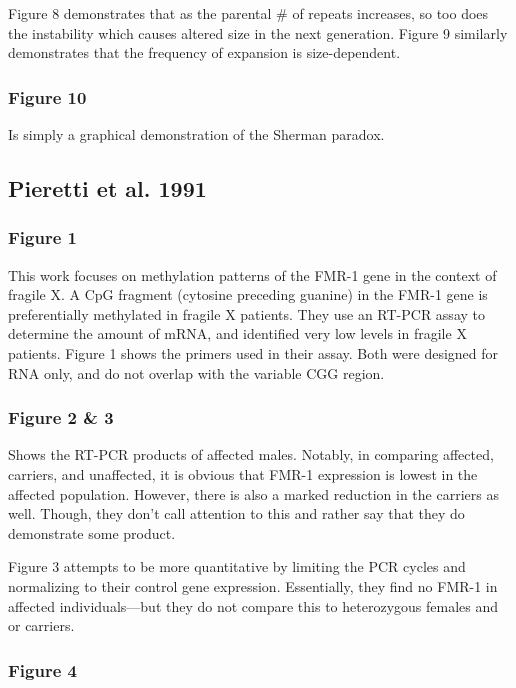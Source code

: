 \documentclass[12pt]{report}
\begin{document}
Figure 8 demonstrates that as the parental \# of repeats increases, so too does the instability which causes altered size in the next generation. Figure 9 similarly demonstrates that the frequency of expansion is size-dependent. 

\subsubsection{Figure 10}

Is simply a graphical demonstration of the Sherman paradox. 


\subsection{Pieretti et al. 1991}

\subsubsection{Figure 1}

This work focuses on methylation patterns of the FMR-1 gene in the context of fragile X. A CpG fragment (cytosine preceding guanine) in the FMR-1 gene is preferentially methylated in fragile X patients. They use an RT-PCR assay to determine the amount of mRNA, and identified very low levels in fragile X patients. Figure 1 shows the primers used in their assay. Both were designed for RNA only, and do not overlap with the variable CGG region. 

\subsubsection{Figure 2 \& 3}

Shows the RT-PCR products of affected males. Notably, in comparing affected, carriers, and unaffected, it is obvious that FMR-1 expression is lowest in the affected population. However, there is also a marked reduction in the carriers as well. Though, they don't call attention to this and rather say that they do demonstrate some product.\newline

Figure 3 attempts to be more quantitative by limiting the PCR cycles and normalizing to their control gene expression. Essentially, they find no FMR-1 in affected individuals---but they do not compare this to heterozygous females and or carriers. 

\subsubsection{Figure 4}
\end{document}
